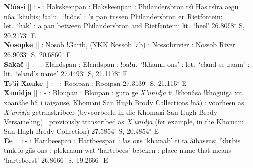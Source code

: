 \textbf{N!\^{o}asi} [] : -
: Hakskeenpan : Hakskeenpan
: Philandersbron ts\^{\i} \textdoublevertline{}H\={a}s
ts\^{\i}ra \textdoublevertline{}aegu \textdoublebarpipe{}n\^{o}a
!khubis; !oa!\={u}.\ `!n\^{o}as' : 'n pan tussen
Philandersbron en Rietfontein; let.\ `hak' : a pan
between Philandersbron and Rietfontein; lit.\ `heel' 26.8098$^{\circ}$
S, 20.2173$^{\circ}$ E \\

\textbf{N\textdoublebarpipe{}osopke}
[] :
\textdoublebarpipe{}Nosob !Garib, (NKK \textdoublebarpipe{}Nossob
!\={a}b) : Nossobrivier : Nossob River
26.9033$^{\circ}$ S, 20.6860$^{\circ}$ E \\

\textbf{Saka\textvertline{}\^{e}} [] : - : Elandspan
: Elandspan : !oa!\={u}.\ `!khanni
\textvertline{}ons' : let.\ `eland se naam'
: lit.\ `eland's name' 27.4493$^{\circ}$ S,
21.1178$^{\circ}$ E \\

\textbf{Ts'ii \textdoublevertline{}Xauke} [] : - :
Rooipan : Rooipan 27.3139$^{\circ}$ S, 21.115$^{\circ}$
E\\

\textbf{Xunidja} [] :
- : Bloupan : Bloupan :
\textdoublebarpipe{}guro ge \emph{X'unidja} ti
!kh\={o}\textdoublevertline{}n\^{a}sa
!kh\={o}\textdoublevertline{}guiga xu
xoa\textdoublevertline{}n\^{a}he h\^{a} i
(ai\textdoublevertline{}gause, \textdoublebarpipe{}Khomani San Hugh
Brody Collections !n\^{a}) : voorheen as
\emph{X'unidja} getranskribeer (byvoorbeeld in die
\textdoublebarpipe{}Khomani San Hugh Brody Versameling)
: previously transcribed as \emph{X'unidja} (for
example, in the \textdoublebarpipe{}Khomani San Hugh Brody
Collection) 27.5854$^{\circ}$ S, 20.4854$^{\circ}$ E \\

\textbf{\textvertline{}Ee} []
: - : Hartbeespan :
Hartbeespan : !\={a}s \textvertline{}ons
`\textdoublevertline{}khamab' ti ra \textdoublebarpipe{}\^{a}ibasens;
!khubis tmk.io \textdoublebarpipe{}g\={a}s \textvertline{}ons
: pleknaam wat `hartebees' beteken : place
name that means `hartebeest' 26.8666$^{\circ}$ S, 19.2666$^{\circ}$ E
\\

